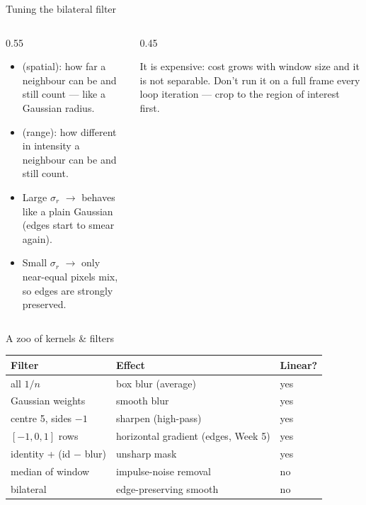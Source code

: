 \documentclass[10pt,aspectratio=169]{beamer}
\begin{document}
\begin{frame}{Tuning the bilateral filter}
  \begin{columns}[T]
    \begin{column}{0.55\textwidth}
      \begin{itemize}
        \item {} (spatial): how far a neighbour can be and still count — like a Gaussian radius.
        \item {} (range): how different in intensity a neighbour can be and still count.
        \item Large $\sigma_r$ $\rightarrow$ behaves like a plain Gaussian (edges start to smear again).
        \item Small $\sigma_r$ $\rightarrow$ only near-equal pixels mix, so edges are strongly preserved.
      \end{itemize}
    \end{column}
    \begin{column}{0.45\textwidth}
      \begin{badbox}
        It is expensive: cost grows with window size and it is not separable. Don't run it on a
        full frame every loop iteration — crop to the region of interest first.
      \end{badbox}
    \end{column}
  \end{columns}
\end{frame}

\begin{frame}{A zoo of kernels \& filters}
  \begin{center}
  \begin{tabular}{@{}lll@{}}
    \toprule
    \textbf{Filter} & \textbf{Effect} & \textbf{Linear?} \\
    \midrule
    all $1/n$ & box blur (average) & yes \\
    Gaussian weights & smooth blur & yes \\
    centre 5, sides $-1$ & sharpen (high-pass) & yes \\
    $[-1,0,1]$ rows & horizontal gradient (edges, Week 5) & yes \\
    identity + (id $-$ blur) & unsharp mask & yes \\
    median of window & impulse-noise removal & no \\
    bilateral & edge-preserving smooth & no \\
    \bottomrule
  \end{tabular}
  \end{center}
\end{frame}
\end{document}

